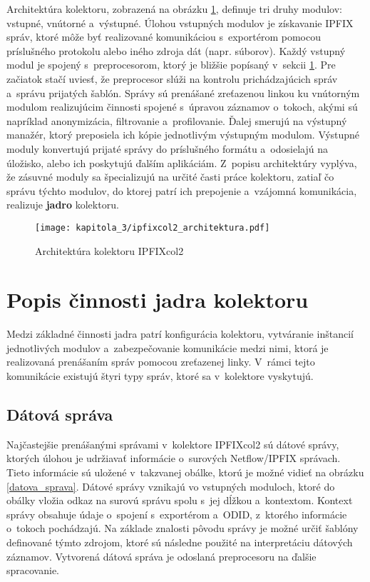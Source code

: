 Architektúra kolektoru, zobrazená na obrázku \ref{ipfixcol2_architektura}, definuje tri druhy modulov: vstupné, vnútorné a~výstupné. Úlohou vstupných modulov je získavanie IPFIX správ, ktoré môže byť realizované komunikáciou s~exportérom pomocou príslušného protokolu alebo iného zdroja dát
(napr. súborov). Každý vstupný modul je spojený s~preprocesorom, ktorý je bližšie popísaný v~sekcii \ref{sec:ipfixcol2_jadro}. Pre začiatok stačí uviesť, že preprocesor slúži na kontrolu prichádzajúcich správ a~správu prijatých šablón. Správy sú prenášané zreťazenou linkou ku vnútorným modulom
realizujúcim činnosti spojené s~úpravou záznamov o~tokoch, akými sú napríklad anonymizácia, filtrovanie a~profilovanie. Ďalej smerujú na výstupný manažér, ktorý preposiela ich kópie jednotlivým výstupným modulom. Výstupné moduly konvertujú prijaté správy do príslušného formátu a~odosielajú na
úložisko, alebo ich poskytujú ďalším aplikáciám. Z~popisu architektúry vyplýva, že zásuvné moduly sa špecializujú na určité časti práce kolektoru, zatiaľ čo správu týchto modulov, do ktorej patrí ich prepojenie a~vzájomná komunikácia, realizuje \textbf{jadro} kolektoru.

\begin{figure}[ht]
    \centering
    \texttt{[image: kapitola\_3/ipfixcol2\_architektura.pdf]}
    \caption{Architektúra kolektoru IPFIXcol2 \cite{hutak}}
    \label{ipfixcol2_architektura}
\end{figure}

\section{Popis činnosti jadra kolektoru}
\label{sec:ipfixcol2_jadro}

Medzi základné činnosti jadra patrí konfigurácia kolektoru, vytváranie inštancií jednotlivých modulov a~zabezpečovanie komunikácie medzi nimi, ktorá je realizovaná prenášaním správ pomocou zreťazenej linky. V~rámci tejto komunikácie existujú štyri
typy správ, ktoré sa v~kolektore vyskytujú.

\subsection*{Dátová správa}

Najčastejšie prenášanými správami v~kolektore IPFIXcol2 sú dátové správy, ktorých úlohou je udržiavať informácie o~surových Netflow/IPFIX správach. Tieto informácie sú uložené v~takzvanej obálke, ktorú je možné vidieť na obrázku \ref{datova_sprava}. Dátové správy vznikajú
vo vstupných moduloch, ktoré do obálky vložia odkaz na surovú správu spolu s~jej dĺžkou a~kontextom. Kontext správy obsahuje údaje o~spojení s~exportérom a~ODID, z~ktorého informácie o~tokoch pochádzajú. Na základe znalosti pôvodu správy je možné určiť šablóny
definované týmto zdrojom, ktoré sú následne použité na interpretáciu dátových záznamov. Vytvorená dátová správa je odoslaná preprocesoru na ďalšie spracovanie.

